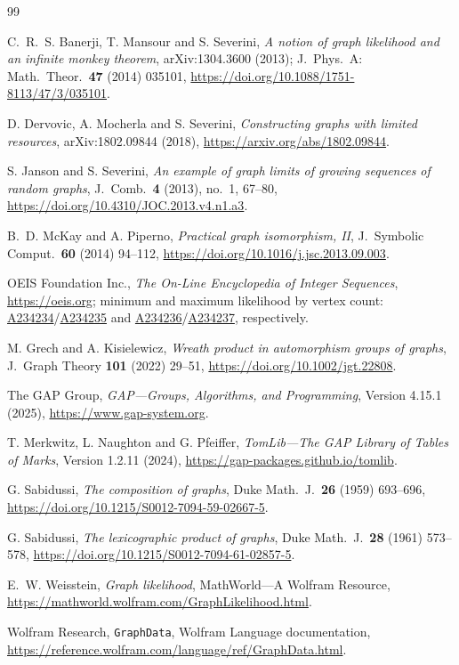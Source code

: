 \documentclass[11pt]{article}
\theoremstyle{definition}
\begin{document}
\begin{thebibliography}{99}
\small
\raggedright
\setlength{\itemsep}{0pt}

 C.~R.~S. Banerji, T. Mansour and S. Severini, \emph{A notion of graph likelihood and an infinite monkey theorem}, arXiv:1304.3600 (2013); J.\ Phys.\ A: Math.\ Theor.\ \textbf{47} (2014) 035101, \url{https://doi.org/10.1088/1751-8113/47/3/035101}.

 D. Dervovic, A. Mocherla and S. Severini, \emph{Constructing graphs with limited resources}, arXiv:1802.09844 (2018), \url{https://arxiv.org/abs/1802.09844}.

 S. Janson and S. Severini, \emph{An example of graph limits of growing sequences of random graphs}, J.\ Comb.\ \textbf{4} (2013), no.~1, 67--80, \url{https://doi.org/10.4310/JOC.2013.v4.n1.a3}.

 B.~D. McKay and A. Piperno, \emph{Practical graph isomorphism, II}, J.\ Symbolic Comput.\ \textbf{60} (2014) 94--112, \url{https://doi.org/10.1016/j.jsc.2013.09.003}.

 OEIS Foundation Inc., \emph{The On-Line Encyclopedia of Integer Sequences}, \url{https://oeis.org}; minimum and maximum likelihood by vertex count: \href{https://oeis.org/A234234}{A234234}/\href{https://oeis.org/A234235}{A234235} and \href{https://oeis.org/A234236}{A234236}/\href{https://oeis.org/A234237}{A234237}, respectively.

 M. Grech and A. Kisielewicz, \emph{Wreath product in automorphism groups of graphs}, J.\ Graph Theory \textbf{101} (2022) 29--51, \url{https://doi.org/10.1002/jgt.22808}.

 The GAP Group, \emph{GAP---Groups, Algorithms, and Programming}, Version 4.15.1 (2025), \url{https://www.gap-system.org}.

 T. Merkwitz, L. Naughton and G. Pfeiffer, \emph{TomLib---The GAP Library of Tables of Marks}, Version 1.2.11 (2024), \url{https://gap-packages.github.io/tomlib}.

 G. Sabidussi, \emph{The composition of graphs}, Duke Math.\ J.\ \textbf{26} (1959) 693--696, \url{https://doi.org/10.1215/S0012-7094-59-02667-5}.

 G. Sabidussi, \emph{The lexicographic product of graphs}, Duke Math.\ J.\ \textbf{28} (1961) 573--578, \url{https://doi.org/10.1215/S0012-7094-61-02857-5}.

 E.~W. Weisstein, \emph{Graph likelihood}, MathWorld---A Wolfram Resource, \url{https://mathworld.wolfram.com/GraphLikelihood.html}.

 Wolfram Research, \texttt{GraphData}, Wolfram Language
documentation, \url{https://reference.wolfram.com/language/ref/GraphData.html}.

\end{thebibliography}
\end{document}
